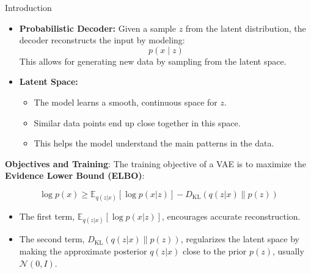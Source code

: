 \begin{frame}[allowframebreaks]{Introduction}
\begin{itemize}
  \item \textbf{Probabilistic Decoder:} Given a sample \( z \) from the latent distribution, the decoder reconstructs the input by modeling:
  \[
  p(x \mid z)
  \]
  This allows for generating new data by sampling from the latent space.

  \framebreak

  \item \textbf{Latent Space:}
    \begin{itemize}
      \item The model learns a smooth, continuous space for \( z \).
      \item Similar data points end up close together in this space.
      \item This helps the model understand the main patterns in the data.
    \end{itemize}
\end{itemize}

\framebreak

\textbf{Objectives and Training}: The training objective of a VAE is to maximize the \textbf{Evidence Lower Bound (ELBO)}:



\[
\log p(x) \geq \mathbb{E}_{q(z|x)}[\log p(x|z)] - D_{\mathrm{KL}}(q(z|x) \| p(z))
\]

\begin{itemize}
  \item The first term, \( \mathbb{E}_{q(z|x)}[\log p(x|z)] \), encourages accurate reconstruction.
  \item The second term, \( D_{\mathrm{KL}}(q(z|x) \| p(z)) \), regularizes the latent space by making the approximate posterior \( q(z|x) \) close to the prior \( p(z) \), usually \( \mathcal{N}(0, I) \).
\end{itemize}


\end{frame}
